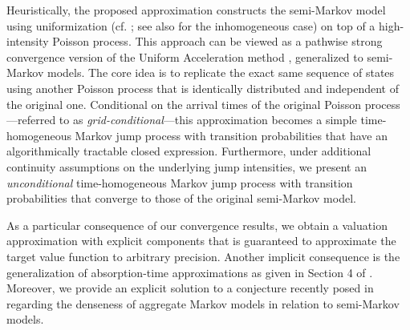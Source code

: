 \documentclass[11pt,leqno]{amsart}
\numberwithin{table}{section}
\numberwithin{figure}{section}
\numberwithin{equation}{section}
\newcommand{\1}{{\mathds{1}}}
\newcommand{\0}{\mat{0}}
\begin{document}
Heuristically, the proposed approximation constructs the semi-Markov model using uniformization (cf. \cite{jensen1953markoff}; see also \cite{van1992uniformization} for the inhomogeneous case) on top of a high-intensity Poisson process. This approach can be viewed as a pathwise strong convergence version of the Uniform Acceleration method \cite{massey1998uniform}, generalized to semi-Markov models. The core idea is to replicate the exact same sequence of states using another Poisson process that is identically distributed and independent of the original one. Conditional on the arrival times of the original Poisson process—referred to as \emph{grid-conditional}—this approximation becomes a simple time-homogeneous Markov jump process with transition probabilities that have an algorithmically tractable closed expression. Furthermore, under additional continuity assumptions on the underlying jump intensities, we present an \emph{unconditional} time-homogeneous Markov jump process with transition probabilities that converge to those of the original semi-Markov model.

As a particular consequence of our convergence results, we obtain a valuation approximation with explicit components that is guaranteed to approximate the target value function to arbitrary precision. Another implicit consequence is the generalization of absorption-time approximations as given in Section 4 of \cite{ahmad2023estimating}.
{ Moreover, we provide an explicit solution to a conjecture recently posed in \cite{ahmad2023aggregate} regarding the denseness of aggregate Markov models in relation to semi-Markov models.}
\end{document}
